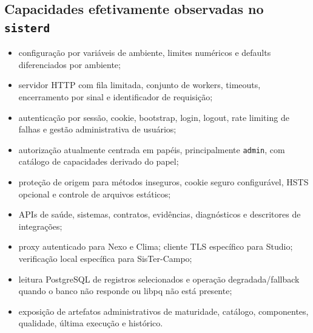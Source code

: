 \documentclass[11pt,a4paper,oneside]{article}
\begin{document}
\subsection{Capacidades efetivamente observadas no \texttt{sisterd}}
\begin{itemize}
  \item configuração por variáveis de ambiente, limites numéricos e defaults diferenciados por ambiente;
  \item servidor HTTP com fila limitada, conjunto de workers, timeouts, encerramento por sinal e identificador de requisição;
  \item autenticação por sessão, cookie, bootstrap, login, logout, rate limiting de falhas e gestão administrativa de usuários;
  \item autorização atualmente centrada em papéis, principalmente \texttt{admin}, com catálogo de capacidades derivado do papel;
  \item proteção de origem para métodos inseguros, cookie seguro configurável, HSTS opcional e controle de arquivos estáticos;
  \item APIs de saúde, sistemas, contratos, evidências, diagnósticos e descritores de integrações;
  \item proxy autenticado para Nexo e Clima; cliente TLS específico para Studio; verificação local específica para SisTer-Campo;
  \item leitura PostgreSQL de registros selecionados e operação degradada/fallback quando o banco não responde ou libpq não está presente;
  \item exposição de artefatos administrativos de maturidade, catálogo, componentes, qualidade, última execução e histórico.
\end{itemize}
\end{document}
